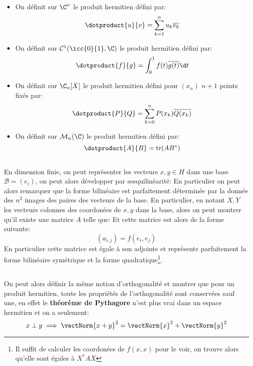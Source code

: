 \subsection*{}
\begin{itemize}
   \item On définit sur \(\C^n\) le produit hermitien défini par:
   \[
      \dotproduct{u}{v} = \sum_{k=1}^{n} u_k\overline{v_k}   
   \]
   \item On définit sur \(\mathcal{C}^1(\icc{0}{1}, \C)\) le produit hermitien défini par:
   \[
      \dotproduct{f}{g} = \int_{0}^{1} f(t)\overline{g(t)} \d t    
   \]
   \item On définit sur \(\C_n[X]\) le produit hermitien défini pour \((x_n)\) \(n + 1\) points fixés par:
   \[
      \dotproduct{P}{Q} = \sum_{k=0}^{n}P(x_k)\overline{Q(x_k)}
   \]   
   \item On définit sur \(\mathcal{M}_n(\C)\) le produit hermitien défini par:
   \[
      \dotproduct{A}{B} = \text{tr}(AB^*)
   \]
\end{itemize}
\subsection*{}
En dimension finie, on peut représenter les vecteurs \(x, y \in H\) dans une base \(\mathscr{B} = (e_i)\), on peut alors développer par sesquilinéarité:
En particulier on peut alors remarquer que la forme bilinéaire est parfaitement déterminée par la donnée des \(n^2\) images des paires des vecteurs de la base. En particulier, en notant \(X, Y\) les vecteurs colonnes des coordonées de \(x, y\) dans la base, alors on peut montrer qu'il existe une matrice \(A\) telle que:
Et cette matrice est alors de la forme suivante:
\[
   (a_{i, j}) = f(e_i, e_j)
\]
En particulier cette matrice est égale à son adjointe et représente parfaitement la forme bilinéaire symétrique et la forme quadratique\footnote[1]{Il suffit de calculer les coordonées de \(f(x, x)\) pour le voir, on trouve alors qu'elle sont égales à \(X^* A X\)}.
\subsection*{}
On peut alors définir la même notion d'orthogonalité et montrer que pour un produit hermitien, toute les propriétés de l'orthogonalité sont conservées sauf une, en effet le \textbf{théorème de Pythagore} n'est plus vrai dans un espace hermitien et on a seulement:
\[
   x \perp y \implies \vectNorm{x + y}^2 = \vectNorm{x}^2 + \vectNorm{y}^2
\]
